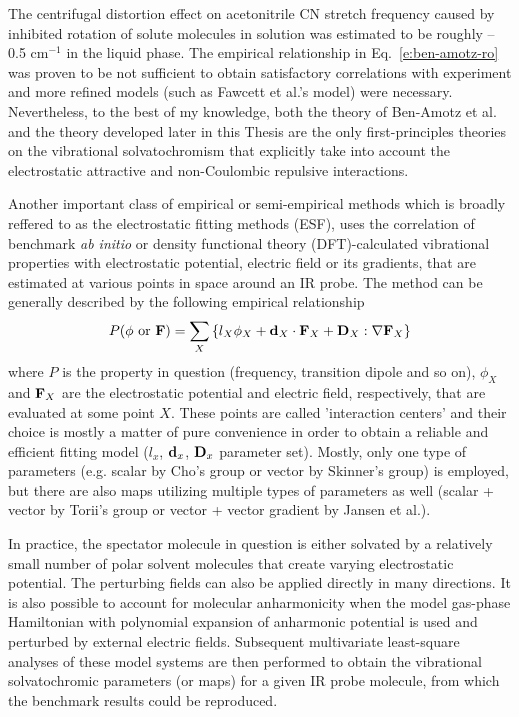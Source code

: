 \documentclass[a4paper,titlepage,twoside,fleqn,12pt]{book}
\begin{document}
\begin{refsection}
The centrifugal distortion effect on acetonitrile CN stretch frequency 
caused by inhibited rotation of solute molecules
in solution was estimated to be roughly --0.5 cm$^{-1}$ in the liquid phase.  
The empirical relationship in Eq.~\eqref{e:ben-amotz-ro} was proven to be not sufficient to obtain 
satisfactory correlations with experiment and more refined
models (such as Fawcett et al.'s model) were necessary.\citep{Reimers.Hall.JACS.1999} 
Nevertheless, 
to the best of my knowledge, both the theory of Ben-Amotz et al.\citep{Ben-Amotz.Lee.Cho.List.JCP.1992} 
and the theory
developed later in this Thesis are the only first-principles theories on the
vibrational solvatochromism that explicitly take into account the electrostatic 
attractive and non-Coulombic repulsive interactions.

Another important class of empirical or semi-empirical methods which is broadly reffered 
to as the electrostatic fitting methods (ESF), uses the correlation of benchmark 
\emph{ab initio} or density functional theory (DFT)-calculated vibrational properties
with electrostatic potential, electric field or its gradients, that are estimated at various
points in space around an IR probe. 
The method can be generally described by the following empirical relationship
%
\begin{equation} \label{e:esf}
 P(\phi \text{ or } {\bf F}) = \sum_X \left\{ l_X \phi_X + {\bf d}_X \cdot {\bf F}_X + {\bf D}_X : \nabla{\bf F}_X \right\}
\end{equation}
%
where $P$ is the property in question (frequency, transition dipole and so on), 
$\phi_X$ and ${\bf F}_X$ are the electrostatic potential and electric field, respectively, that are
evaluated at some point $X$.
These points are called 'interaction centers' and their
choice is mostly a matter of pure convenience in order to obtain a reliable and efficient
fitting model ($l_x$, ${\bf d}_x$, ${\bf D}_x$ parameter set). Mostly, only one type of parameters
(e.g. scalar by Cho's group or vector by Skinner's group) is employed, but there are also maps utilizing multiple types of parameters
as well (scalar + vector by Torii's group or vector + vector gradient by Jansen et al.).
 
In practice, the spectator molecule in question is either solvated by a relatively small number of polar 
solvent molecules that create varying electrostatic potential. The perturbing fields can also be applied directly
in many directions. It is also possible to account for molecular anharmonicity
when the model gas-phase Hamiltonian with polynomial expansion of anharmonic potential
is used and perturbed by external electric fields.
Subsequent multivariate
least-square analyses of these model systems are then performed to obtain the vibrational 
solvatochromic parameters (or maps) for a given IR probe molecule, from which the benchmark
results could be reproduced. 


\end{refsection}
\end{document}
